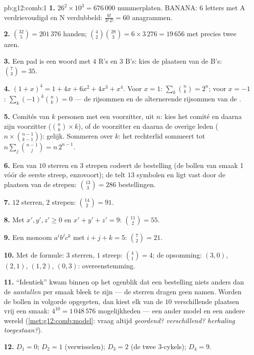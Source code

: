 \begin{solution}{pb:g12:comb:1}
\textbf{1.} $26^2 \times 10^3 = 676\,000$ nummerplaten. BANANA: $6$ letters
met A verdrievoudigd en N verdubbeld: $\frac{6!}{3!\,2!} = 60$ anagrammen.

\textbf{2.} $\binom{32}{5} = 201\,376$ handen; $\binom42 \binom{28}{3} = 6
\times 3\,276 = 19\,656$ met precies twee azen.

\textbf{3.} Een pad is een woord met $4$ R's en $3$ B's: kies de plaatsen van
de B's: $\binom73 = 35$.

\textbf{4.} $(1+x)^4 = 1 + 4x + 6x^2 + 4x^3 + x^4$. Voor $x = 1$:
$\sum_k \binom nk = 2^n$; voor $x = -1$: $\sum_k (-1)^k \binom nk = 0$ ---
de rijsommen en de alternerende rijsommen van de .

\textbf{5.} Comités van $k$ personen met een voorzitter, uit $n$: kies het
comité en daarna zijn voorzitter ($\binom nk \times k$), of de voorzitter en
daarna de overige leden ($n \times \binom{n-1}{k-1}$): gelijk. Sommeren over
$k$: het rechterlid sommeert tot $n \sum_j \binom{n-1}{j} = n\,2^{n-1}$.

\textbf{6.} Een  van $10$ sterren en $3$ strepen codeert de bestelling
(de bollen van smaak 1 vóór de eerste streep, enzovoort); de  telt $13$
symbolen en ligt vast door de plaatsen van de strepen:
$\binom{13}{3} = 286$ bestellingen.

\textbf{7.} $12$ sterren, $2$ strepen: $\binom{14}{2} = 91$.

\textbf{8.} Met $x', y', z' \geq 0$ en $x' + y' + z' = 9$:
$\binom{11}{2} = 55$.

\textbf{9.} Een monoom $a^i b^j c^k$ met $i + j + k = 5$: $\binom72 = 21$.

\textbf{10.} Met de formule: $3$ sterren, $1$ streep: $\binom41 = 4$; de
opsomming: $(3,0)$, $(2,1)$, $(1,2)$, $(0,3)$: overeenstemming.

\textbf{11.} ``Identiek'' kwam binnen op het ogenblik dat een bestelling niets
anders dan de \emph{aantallen} per smaak bleek te zijn --- de sterren dragen
geen namen. Worden de bollen in volgorde opgegeten, dan kiest elk van de $10$
verschillende plaatsen vrij een smaak: $4^{10} = 1\,048\,576$ mogelijkheden
--- een ander model en een andere wereld (\cref{met:g12:comb:model}: vraag
altijd \emph{geordend? verschillend? herhaling toegestaan?}).

\textbf{12.} $D_1 = 0$; $D_2 = 1$ (verwisselen); $D_3 = 2$ (de twee
$3$-cykels); $D_4 = 9$.


\end{solution}
